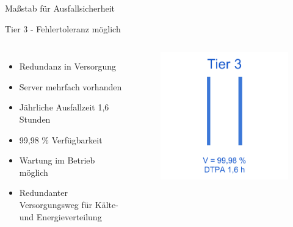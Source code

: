 \documentclass[10pt]{beamer}
\begin{document}
\begin{frame}[fragile]{Maßstab für Ausfallsicherheit}
\begin{alertblock}{Tier 3 - Fehlertoleranz möglich}
\end{alertblock}
\begin{columns}[T,c,onlytextwidth]
	\begin{itemize}
		\item Redundanz in Versorgung
		\item Server mehrfach vorhanden
		\item Jährliche Ausfallzeit 1,6 Stunden
		\item 99,98 \% Verfügbarkeit
		\item Wartung im Betrieb möglich
		\item Redundanter Versorgungsweg für Kälte- und Energieverteilung
	\end{itemize}
	\begin{figure}
		\includegraphics[width=1\textwidth]{images/tier3}
	\end{figure}
\end{columns}
\end{frame}
\end{document}
